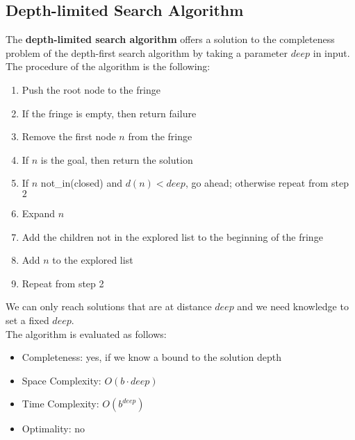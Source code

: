 \documentclass{article}
\begin{document}
\subsection{Depth-limited Search Algorithm}
The \textbf{depth-limited search algorithm} offers a solution to the completeness problem of the depth-first search algorithm by taking a parameter $deep$ in input. \\
The procedure of the algorithm is the following:
\begin{enumerate}
    \item Push the root node to the fringe
    \item If the fringe is empty, then return failure
    \item Remove the first node $n$ from the fringe
    \item If $n$ is the goal, then return the solution
    \item If $n$ not\_in(closed) and $d(n) < deep$, go ahead; otherwise repeat from step $2$
    \item Expand $n$
    \item Add the children not in the explored list to the beginning of the fringe
    \item Add $n$ to the explored list
    \item Repeat from step 2
\end{enumerate}
We can only reach solutions that are at distance $deep$ and we need knowledge to set a fixed $deep$. \\
The algorithm is evaluated as follows:
\begin{itemize}
    \item Completeness: yes, if we know a bound to the solution depth
    \item Space Complexity: $O(b \cdot deep)$
    \item Time Complexity: $O(b^{deep})$
    \item Optimality: no
\end{itemize}
\end{document}
